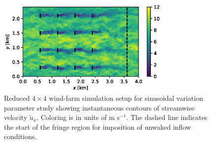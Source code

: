 \begin{figure}
	\centering
	\includegraphics[width=0.75\textwidth]{chapters/analysis_induction_control/setup_sinusoidal.eps}
	\caption{Reduced $4 \times 4$ wind-farm simulation setup for sinusoidal variation parameter study showing instantaneous contours of streamwise velocity $\widetilde{u}_x$. Coloring is in units of m s$^{-1}$. The dashed line indicates the start of the fringe region for imposition of unwaked inflow conditions. \label{fig:sinus_setup}}
\end{figure}

